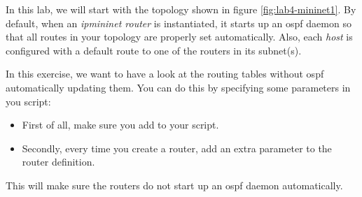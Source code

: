 In this lab, we will start with the topology shown in figure \ref{fig:lab4-mininet1}.
By default, when an \emph{ipmininet router} is instantiated, it starts up an \acs{ospf} daemon so that all routes in your topology are properly set automatically. Also, each \emph{host} is configured with a default route to one of the routers in its subnet(s).

In this exercise, we want to have a look at the routing tables without \acs{ospf} automatically updating them. You can do this by specifying some parameters in you script:

\begin{itemize}
	\item First of all, make sure you add  to your script.
	\item Secondly, every time you create a router, add an extra parameter  to the router definition.
\end{itemize}

This will make sure the routers do not start up an \acs{ospf} daemon automatically.

